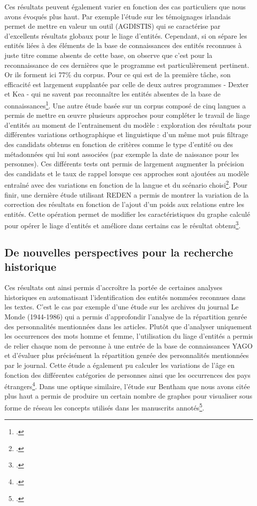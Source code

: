 \documentclass[a4paper,12pt,twoside]{book}
\begin{document}
	Ces résultats peuvent également varier en fonction des cas particuliers que nous avons évoqués plus haut. Par exemple l'étude sur les témoignages irlandais permet de mettre en valeur un outil (AGDISTIS) qui se caractérise par d'excellents résultats globaux pour le liage d'entités. Cependant, si on sépare les entités liées à des éléments de la base de connaissances des entités reconnues à juste titre comme absents de cette base, on observe que c'est pour la reconnaissance de ces dernières que le programme est particulièrement pertinent. Or ils forment ici 77\% du corpus. Pour ce qui est de la première tâche, son efficacité est largement supplantée par celle de deux autres programmes - Dexter et Kea - qui ne savent pas reconnaître les entités absentes de la base de connaissances\footcite{munnelly_investigating_2018}. Une autre étude basée sur un corpus composé de cinq langues a permis de mettre en œuvre plusieurs approches pour compléter le travail de liage d'entités au moment de l'entrainement du modèle : exploration des résultats pour différentes variations orthographique et linguistique d'un même mot puis filtrage des candidats obtenus en fonction de critères comme le type d'entité ou des métadonnées qui lui sont associées (par exemple la date de naissance pour les personnes). Ces différents tests ont permis de largement augmenter la précision des candidats et le taux de rappel lorsque ces approches sont ajoutées au modèle entraîné avec des variations en fonction de la langue et du scénario choisi\footcite{linhares_pontes_entity_2020}. Pour finir, une dernière étude utilisant REDEN a permis de montrer la variation de la correction des résultats en fonction de l'ajout d'un poids aux relations entre les entités. Cette opération permet de modifier les caractéristiques du graphe calculé pour opérer le liage d'entités et améliore dans certains cas le résultat obtenu\footcite{morzy_disambiguation_2015}.
	
	\subsection{De nouvelles perspectives pour la recherche historique}
	
	Ces résultats ont ainsi permis d'accroître la portée de certaines analyses historiques en automatisant l'identification des entités nommées reconnues dans les textes. C'est le cas par exemple d'une étude sur les archives du journal Le Monde (1944-1986) qui a permis d'approfondir l'analyse de la répartition genrée des personnalités mentionnées dans les articles. Plutôt que d'analyser uniquement les occurrences des mots \og homme\fg{} et \og femme\fg{}, l'utilisation du liage d'entités a permis de relier chaque nom de personne à une entrée de la base de connaissances YAGO et d'évaluer plus précisément la répartition genrée des personnalités mentionnées par le journal. Cette étude a également pu calculer les variations de l'âge en fonction des différentes catégories de personnes ainsi que les occurrences des pays étrangers\footcite{huet_mining_2013}. Dans une optique similaire, l'étude sur Bentham que nous avons citée plus haut a permis de produire un certain nombre de graphes pour visualiser sous forme de réseau les concepts utilisés dans les manuscrits annotés\footcite{ruiz_mapping_2019}. 
	
\end{document}
